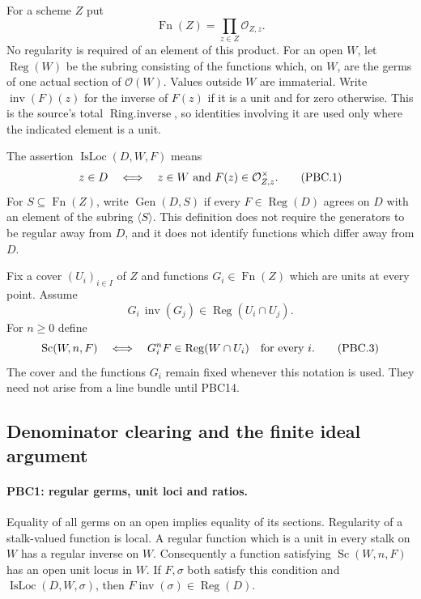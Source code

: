 \documentclass[11pt,a4paper]{article}
\numberwithin{equation}{section}
\theoremstyle{remark}\newtheorem{remark}[theorem]{Remark}
\begin{document}
For a scheme $Z$ put
\[
 \operatorname{Fn}(Z)=\prod_{z\in Z}\mathcal O_{Z,z}.
\]
No regularity is required of an element of this product.  For an open
$W$, let $\operatorname{Reg}(W)$ be the subring consisting of the
functions which, on $W$, are the germs of one actual section of
$\mathcal O(W)$.  Values outside $W$ are immaterial.  Write
$\operatorname{inv}(F)(z)$ for the inverse of $F(z)$ if it is a unit
and for zero otherwise.  This is the source's total
$\operatorname{Ring.inverse}$, so identities involving it are used
only where the indicated element is a unit.

The assertion $\operatorname{IsLoc}(D,W,F)$ means
\[
 z\in D\quad\Longleftrightarrow\quad
 z\in W\ \hbox{and}\ F(z)\in\mathcal O_{Z,z}^{\times}.
                                                        \tag{PBC.1}
\]
For $S\subseteq\operatorname{Fn}(Z)$, write
$\operatorname{Gen}(D,S)$ if every $F\in\operatorname{Reg}(D)$
agrees on $D$ with an element of the subring $\langle S\rangle$.
This definition does not require the generators to be regular away
from $D$, and it does not identify functions which differ away from $D$.

Fix a cover $(U_i)_{i\in I}$ of $Z$ and functions
$G_i\in\operatorname{Fn}(Z)$ which are units at every point.  Assume
\[
 G_i\,\operatorname{inv}(G_j)\in
       \operatorname{Reg}(U_i\cap U_j).
                                                        \tag{PBC.2}
\]
For $n\ge0$ define
\[
 \operatorname{Sc}(W,n,F)
 \quad\Longleftrightarrow\quad
 G_i^nF\in\operatorname{Reg}(W\cap U_i)
       \quad\hbox{for every }i.
                                                        \tag{PBC.3}
\]
The cover and the functions $G_i$ remain fixed whenever this notation
is used.  They need not arise from a line bundle until PBC14.

\subsection{Denominator clearing and the finite ideal argument}

\paragraph{PBC1: regular germs, unit loci and ratios.}
\label{claim:PBC1}
Equality of all germs on an open implies equality of its sections.
Regularity of a stalk-valued function is local.  A regular function
which is a unit in every stalk on $W$ has a regular inverse on $W$.
Consequently a function satisfying $\operatorname{Sc}(W,n,F)$
has an open unit locus in $W$.  If $F,\sigma$ both satisfy this
condition and $\operatorname{IsLoc}(D,W,\sigma)$, then
$F\operatorname{inv}(\sigma)\in\operatorname{Reg}(D)$.
\end{document}
